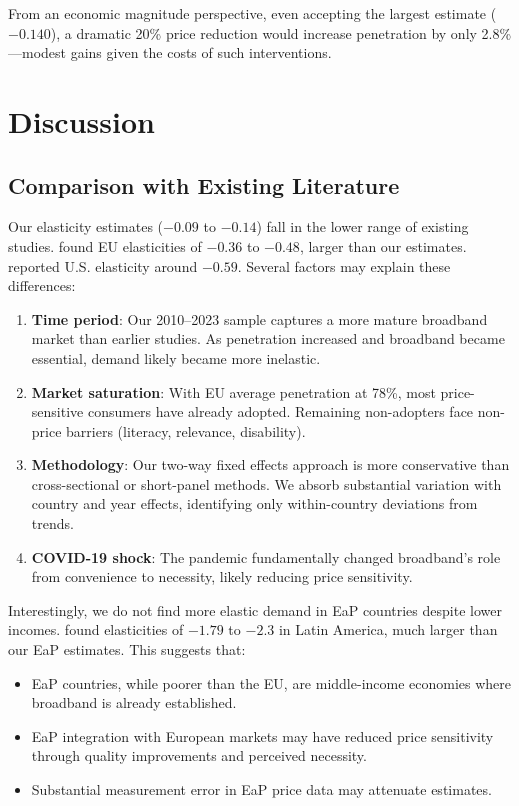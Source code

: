 \documentclass[12pt,review]{elsarticle}
\begin{document}
From an economic magnitude perspective, even accepting the largest estimate ($-0.140$), a dramatic 20\% price reduction would increase penetration by only 2.8\%---modest gains given the costs of such interventions.

\section{Discussion}
\label{sec:discussion}

\subsection{Comparison with Existing Literature}

Our elasticity estimates ($-0.09$ to $-0.14$) fall in the lower range of existing studies. \citet{cardona2009demand} found EU elasticities of $-0.36$ to $-0.48$, larger than our estimates. \citet{rosston2010household} reported U.S. elasticity around $-0.59$. Several factors may explain these differences:

\begin{enumerate}
\item \textbf{Time period}: Our 2010--2023 sample captures a more mature broadband market than earlier studies. As penetration increased and broadband became essential, demand likely became more inelastic.

\item \textbf{Market saturation}: With EU average penetration at 78\%, most price-sensitive consumers have already adopted. Remaining non-adopters face non-price barriers (literacy, relevance, disability).

\item \textbf{Methodology}: Our two-way fixed effects approach is more conservative than cross-sectional or short-panel methods. We absorb substantial variation with country and year effects, identifying only within-country deviations from trends.

\item \textbf{COVID-19 shock}: The pandemic fundamentally changed broadband's role from convenience to necessity, likely reducing price sensitivity.
\end{enumerate}

Interestingly, we do not find more elastic demand in EaP countries despite lower incomes. \citet{galperin2017price} found elasticities of $-1.79$ to $-2.3$ in Latin America, much larger than our EaP estimates. This suggests that:
\begin{itemize}
\item EaP countries, while poorer than the EU, are middle-income economies where broadband is already established.
\item EaP integration with European markets may have reduced price sensitivity through quality improvements and perceived necessity.
\item Substantial measurement error in EaP price data may attenuate estimates.
\end{itemize}
\end{document}
